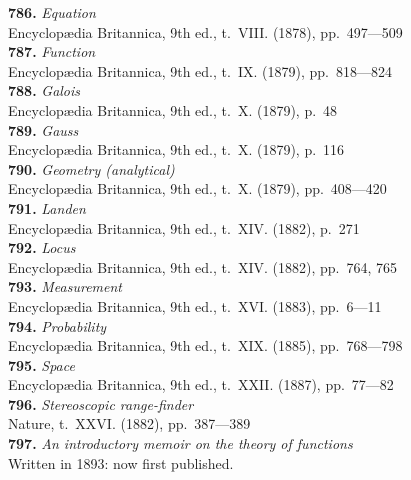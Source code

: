 \documentclass[11pt,a4paper]{book}
\begin{document}
\textbf{786.} \textit{Equation} \\
\hspace*{2em}Encyclop\ae{}dia Britannica, 9th ed., t.~VIII. (1878), pp.~497---509\\[0.3em]
\textbf{787.} \textit{Function} \\
\hspace*{2em}Encyclop\ae{}dia Britannica, 9th ed., t.~IX. (1879), pp.~818---824\\[0.3em]
\textbf{788.} \textit{Galois} \\
\hspace*{2em}Encyclop\ae{}dia Britannica, 9th ed., t.~X. (1879), p.~48\\[0.3em]
\textbf{789.} \textit{Gauss} \\
\hspace*{2em}Encyclop\ae{}dia Britannica, 9th ed., t.~X. (1879), p.~116\\[0.3em]
\textbf{790.} \textit{Geometry (analytical)} \\
\hspace*{2em}Encyclop\ae{}dia Britannica, 9th ed., t.~X. (1879), pp.~408---420\\[0.3em]
\textbf{791.} \textit{Landen} \\
\hspace*{2em}Encyclop\ae{}dia Britannica, 9th ed., t.~XIV. (1882), p.~271\\[0.3em]
\textbf{792.} \textit{Locus} \\
\hspace*{2em}Encyclop\ae{}dia Britannica, 9th ed., t.~XIV. (1882), pp.~764, 765\\[0.3em]
\textbf{793.} \textit{Measurement} \\
\hspace*{2em}Encyclop\ae{}dia Britannica, 9th ed., t.~XVI. (1883), pp.~6---11\\[0.3em]
\textbf{794.} \textit{Probability} \\
\hspace*{2em}Encyclop\ae{}dia Britannica, 9th ed., t.~XIX. (1885), pp.~768---798\\[0.3em]
\textbf{795.} \textit{Space} \\
\hspace*{2em}Encyclop\ae{}dia Britannica, 9th ed., t.~XXII. (1887), pp.~77---82\\[0.3em]
\textbf{796.} \textit{Stereoscopic range-finder} \\
\hspace*{2em}Nature, t.~XXVI. (1882), pp.~387---389\\[0.3em]
\textbf{797.} \textit{An introductory memoir on the theory of functions} \\
\hspace*{2em}Written in 1893: now first published.
\end{document}

